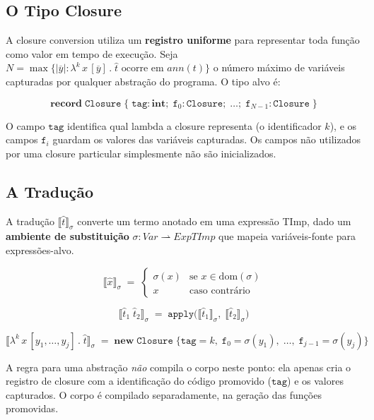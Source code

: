 \subsection{O Tipo Closure}

A closure conversion utiliza um \textbf{registro uniforme} para
representar toda função como valor em tempo de execução. Seja
\(N = \max\{|\overline{y}| : \lambda^k\, x\,[\overline{y}]\,.\;\hat{t}
\text{ ocorre em } \mathit{ann}(t)\}\) o número máximo de variáveis
capturadas por qualquer abstração do programa. O tipo alvo é:

\[
  \mathbf{record}\;\mathtt{Closure}\;\{
    \;\mathtt{tag} : \mathbf{int};\;
    \mathtt{f}_0 : \mathtt{Closure};\;
    \ldots;\;
    \mathtt{f}_{N-1} : \mathtt{Closure}\;\}
\]

O campo \(\mathtt{tag}\) identifica qual lambda a closure representa
(o identificador \(k\)), e os campos \(\mathtt{f}_i\) guardam os
valores das variáveis capturadas. Os campos não utilizados por uma
closure particular simplesmente não são inicializados.

\subsection{A Tradução}

A tradução \(\llbracket \hat{t}\rrbracket_\sigma\) converte um termo
anotado em uma expressão TImp, dado um \textbf{ambiente de
substituição} \(\sigma : \mathit{Var} \rightharpoonup
\mathit{ExpTImp}\) que mapeia variáveis-fonte para expressões-alvo.

\[
  \llbracket \hat{x} \rrbracket_\sigma \;=\;
  \begin{cases}
    \sigma(x) & \text{se } x \in \mathrm{dom}(\sigma) \\
    x         & \text{caso contrário}
  \end{cases}
\]

\[
  \llbracket \hat{t}_1\; \hat{t}_2 \rrbracket_\sigma \;=\;
  \mathtt{apply}\bigl(\llbracket \hat{t}_1 \rrbracket_\sigma,\;
  \llbracket \hat{t}_2 \rrbracket_\sigma\bigr)
\]

\[
  \llbracket \lambda^k\, x\,[y_1,\ldots,y_j]\,.\;\hat{t}
  \rrbracket_\sigma \;=\;
  \mathbf{new}\;\mathtt{Closure}\;\bigl\{
    \mathtt{tag} = k,\;
    \mathtt{f}_0 = \sigma(y_1),\;
    \ldots,\;
    \mathtt{f}_{j-1} = \sigma(y_j)
  \bigr\}
\]

A regra para uma abstração \emph{não} compila o corpo neste ponto: ela
apenas cria o registro de closure com a identificação do código
promovido (\(\mathtt{tag}\)) e os valores capturados. O corpo é
compilado separadamente, na geração das funções promovidas.

